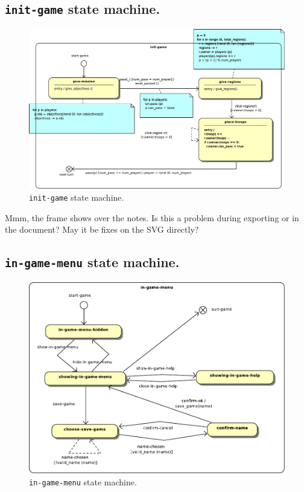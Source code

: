 \documentclass[12pt,a4paper]{article}
\begin{document}
\subsection{\texttt{init-game} state machine.}
\begin{figure}[H]
  \centering
  \includegraphics[width=15cm]{pic/3.pdf}
  \caption{\texttt{init-game} state machine.}
  \label{fig:sm:init-game}
\end{figure}

\begin{todo}
  Mmm, the frame shows over the notes. Is this a problem during exporting or in the document? May it be fixes on the SVG directly?
\end{todo}

\subsection{\texttt{in-game-menu} state machine.}
\begin{figure}[H]
  \centering
  \includegraphics[width=14cm]{pic/4.pdf}
  \caption{\texttt{in-game-menu} state machine.}
  \label{fig:sm:in-game-menu}
\end{figure}
\end{document}

